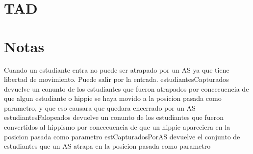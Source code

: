 \documentclass[10pt, a4paper]{article}
\renewcommand{\paratodo}[2]{$\forall~#2$: #1}
\begin{document}
\section{TAD }

\begin{tad}{}





\tadGeneradores


\tadObservadores


\tadAxiomas[\paratodo{nat}{an, al}, \paratodo{grilla}{g}, \paratodo{posicion}{p}]




\end{tad}

\section{Notas}

Cuando un estudiante entra no puede ser atrapado por un AS ya que tiene libertad de movimiento. Puede salir por la entrada.
\newline estudiantesCapturados devuelve un conunto de los estudiantes que fueron atrapados por concecuencia de que algun estudiante o hippie se haya movido a la posicion pasada como parametro, y que eso causara que quedara encerrado por un AS
\newline estudiantesFalopeados devuelve un conunto de los estudiantes que fueron convertidos al hippismo por concecuencia de que un hippie apareciera en la posicion pasada como parametro
\newline estCapturadosPorAS devuelve el conjunto de estudiantes que un AS atrapa en la posicion pasada como parametro
\end{document}
